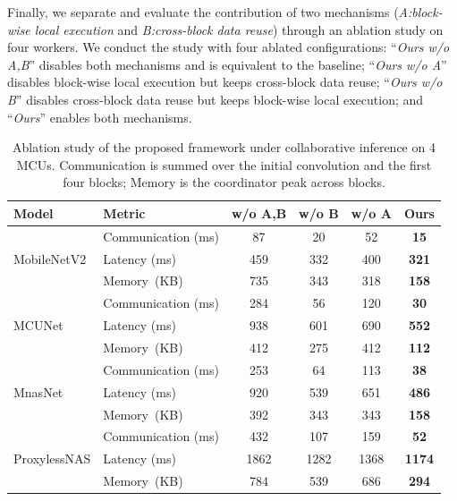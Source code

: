 Finally, we separate and evaluate the contribution of two mechanisms (\emph{A:block-wise local execution} and \emph{B:cross-block data reuse}) through an ablation study on four workers. We conduct the study with four ablated configurations: ``\emph{Ours w/o A,B}'' disables both mechanisms and is equivalent to the baseline; ``\emph{Ours w/o A}'' disables block-wise local execution but keeps cross-block data reuse; ``\emph{Ours w/o B}'' disables cross-block data reuse but keeps block-wise local execution; and ``\emph{Ours}'' enables both mechanisms.


\begin{table}[t]
\centering
\caption{Ablation study of the proposed framework under collaborative inference on 4 MCUs. Communication is summed over the initial convolution and the first four blocks; Memory is the coordinator peak across blocks.}
\label{tab:eval-ablation}
\setlength{\tabcolsep}{6pt}
\renewcommand{\arraystretch}{1.2}
\begin{tabular}{@{}ll cccc@{}}
\toprule
\textbf{Model} & \textbf{Metric} & w/o A,B & w/o B & w/o A & \textbf{Ours} \\
\midrule
\multirow{3}{*}{MobileNetV2}
  & Communication (ms)  & 87   & 20   & 52   & \textbf{15}   \\
  & Latency (ms) & 459  & 332  & 400  & \textbf{321}  \\
  & Memory\ (KB)   & 735  & 343  & 318  & \textbf{158}  \\
\midrule
\multirow{3}{*}{MCUNet}
  & Communication (ms)  & 284  & 56   & 120  & \textbf{30}   \\
  & Latency (ms) & 938  & 601  & 690  & \textbf{552}  \\
  & Memory\ (KB)   & 412  & 275  & 412  & \textbf{112}  \\
\midrule
\multirow{3}{*}{MnasNet}
  & Communication (ms)  & 253  & 64   & 113  & \textbf{38}   \\
  & Latency (ms) & 920  & 539  & 651  & \textbf{486}  \\
  & Memory\ (KB)   & 392  & 343  & 343  & \textbf{158}  \\
\midrule
\multirow{3}{*}{ProxylessNAS}
  & Communication (ms)  & 432  & 107  & 159  & \textbf{52}   \\
  & Latency (ms) & 1862 & 1282 & 1368 & \textbf{1174} \\
  & Memory\ (KB)   & 784  & 539  & 686  & \textbf{294}  \\
\bottomrule
\end{tabular}
\end{table}


